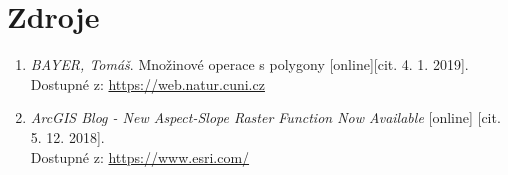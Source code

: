 \documentclass[a4paper, 12pt]{article}
\begin{document}
\section{Zdroje}
\begin{enumerate}
\item  \textsl{BAYER, Tomáš}. Množinové operace s polygony [online][cit. 4. 1. 2019].\\
Dostupné z: \href{https://web.natur.cuni.cz/~bayertom/images/courses/Adk/adk9.pdf}{https://web.natur.cuni.cz}

\item  \textsl{ArcGIS Blog - New Aspect-Slope Raster Function Now Available} [online] [cit. 5. 12. 2018].\\
Dostupné z: \href{https://www.esri.com/arcgis-blog/products/arcgis-pro/imagery/new-aspect-slope-raster-function-now-available/?fbclid=IwAR0LX-HblA_iPSqg19aUKDW096LjaShp9r_ql8QwA_OJ26EkcFTpOEWJrlg}{https://www.esri.com/}
\end{enumerate}
\end{document}

